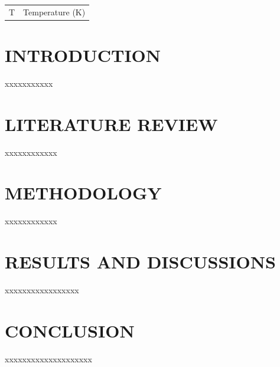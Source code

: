 \documentclass[12pt]{report}
\begin{document}
\begin{table}[H]
    \centering
    \begin{tabular}{c l}
        T & Temperature (K)\\
        
    \end{tabular}
\end{table}






\newpage
{}


\chapter{INTRODUCTION}


xxxxxxxxxxx
\newpage
\chapter{LITERATURE REVIEW}

xxxxxxxxxxxx
\newpage
\chapter{METHODOLOGY}

xxxxxxxxxxxx

\chapter{RESULTS AND DISCUSSIONS}
xxxxxxxxxxxxxxxxx
\newpage
\chapter{CONCLUSION}
xxxxxxxxxxxxxxxxxxxx

%
%


\end{document}
